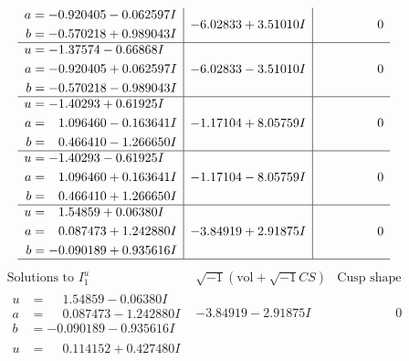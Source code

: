 \documentclass[1p]{elsarticle_modified}
\theoremstyle{definition}
\newcommand{\I}{\sqrt{-1}}
\begin{document}
$$\begin{array}{c|c|c}
\begin{aligned}
a &= -0.920405 - 0.062597 I \\
b &= -0.570218 + 0.989043 I\end{aligned}
 & -6.02833 + 3.51010 I & \phantom{-0.000000 } 0 \\ \hline\begin{aligned}
u &= -1.37574 - 0.66868 I \\
a &= -0.920405 + 0.062597 I \\
b &= -0.570218 - 0.989043 I\end{aligned}
 & -6.02833 - 3.51010 I & \phantom{-0.000000 } 0 \\ \hline\begin{aligned}
u &= -1.40293 + 0.61925 I \\
a &= \phantom{-}1.096460 - 0.163641 I \\
b &= \phantom{-}0.466410 - 1.266650 I\end{aligned}
 & -1.17104 + 8.05759 I & \phantom{-0.000000 } 0 \\ \hline\begin{aligned}
u &= -1.40293 - 0.61925 I \\
a &= \phantom{-}1.096460 + 0.163641 I \\
b &= \phantom{-}0.466410 + 1.266650 I\end{aligned}
 & -1.17104 - 8.05759 I & \phantom{-0.000000 } 0 \\ \hline\begin{aligned}
u &= \phantom{-}1.54859 + 0.06380 I \\
a &= \phantom{-}0.087473 + 1.242880 I \\
b &= -0.090189 + 0.935616 I\end{aligned}
 & -3.84919 + 2.91875 I & \phantom{-0.000000 } 0\\
 \hline 
 \end{array}$$\newpage$$\begin{array}{c|c|c}  
\text{Solutions to }I^u_{1}& \I (\text{vol} + \sqrt{-1}CS) & \text{Cusp shape}\\
 \hline 
\begin{aligned}
u &= \phantom{-}1.54859 - 0.06380 I \\
a &= \phantom{-}0.087473 - 1.242880 I \\
b &= -0.090189 - 0.935616 I\end{aligned}
 & -3.84919 - 2.91875 I & \phantom{-0.000000 } 0 \\ \hline\begin{aligned}
u &= \phantom{-}0.114152 + 0.427480 I \\

\end{aligned}
\end{array}$$
\end{document}
